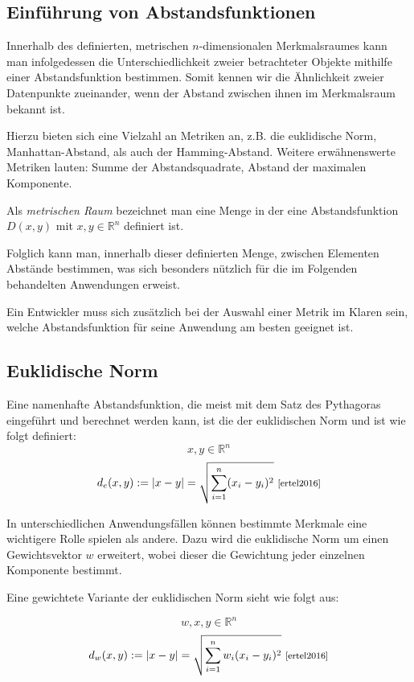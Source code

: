 \documentclass[fontsize=11pt]{scrartcl}
\begin{document}
            \subsection{Einführung von Abstandsfunktionen}
                Innerhalb des definierten, metrischen $n$-dimensionalen Merkmalsraumes kann man infolgedessen die Unterschiedlichkeit zweier betrachteter Objekte mithilfe einer Abstandsfunktion bestimmen. Somit kennen wir die Ähnlichkeit zweier Datenpunkte zueinander, wenn der Abstand zwischen ihnen im Merkmalsraum bekannt ist.\par Hierzu bieten sich eine Vielzahl an Metriken an, z.B. die euklidische Norm, Manhattan-Abstand, als auch der Hamming-Abstand. Weitere erwähnenswerte Metriken lauten: Summe der Abstandsquadrate, Abstand der maximalen Komponente.\par 
                Als \emph{metrischen Raum} bezeichnet man eine Menge in der eine Abstandsfunktion $D(x,y)$ mit $x,y \in \mathbb{R}^n$ definiert ist.\par
                Folglich kann man, innerhalb dieser definierten Menge, zwischen Elementen Abstände bestimmen, was sich besonders nützlich für die im Folgenden behandelten Anwendungen erweist. \par
                Ein Entwickler muss sich zusätzlich bei der Auswahl einer Metrik im Klaren sein, welche Abstandsfunktion für seine Anwendung am besten geeignet ist.
            \subsection{Euklidische Norm}
                Eine namenhafte Abstandsfunktion, die meist mit dem Satz des Pythagoras eingeführt und berechnet werden kann, ist die der euklidischen Norm und ist wie folgt definiert:
                $$
                    x,y \in \mathbb{R}^n
                $$
                $$
                    d_e(x,y):= |x - y| = \sqrt{\sum_{i=1}^{n}(x_i -y_i)^2} \text{ \footnotesize\cite[S.207]{ertel2016}}
                $$

                In unterschiedlichen Anwendungsfällen können bestimmte Merkmale eine wichtigere Rolle spielen als andere.\cite{ertel2016} Dazu wird die euklidische Norm um einen Gewichtsvektor $w$ erweitert, wobei dieser die Gewichtung jeder einzelnen Komponente bestimmt.\par Eine gewichtete Variante der euklidischen Norm sieht wie folgt aus:\par
                $$
                    w,x,y \in \mathbb{R}^n
                $$
                $$
                    d_w(x,y):= |x - y| = \sqrt{\sum_{i=1}^{n}w_i(x_i -y_i)^2} \text{ \footnotesize\cite[S.207]{ertel2016}}
                $$     
\end{document}
